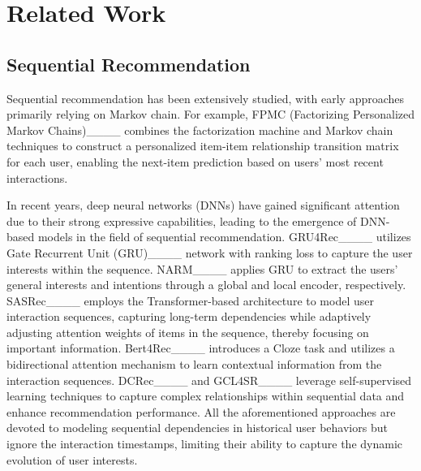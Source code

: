 \section{Related Work}
\subsection{Sequential Recommendation}
Sequential recommendation has been extensively studied, with early approaches primarily relying on Markov chain. For example, FPMC (Factorizing Personalized Markov Chains)____ combines the factorization machine and Markov chain techniques to construct a personalized item-item relationship transition matrix for each user, enabling the next-item prediction based on users' most recent interactions.

In recent years, deep neural networks (DNNs) have gained significant attention due to their strong expressive capabilities, leading to the emergence of DNN-based models in the field of sequential recommendation. GRU4Rec____ utilizes Gate Recurrent Unit (GRU)____ network with ranking loss to capture the user interests within the sequence. NARM____ applies GRU to extract the users' general interests and intentions through a global and local encoder, respectively. SASRec____ employs the Transformer-based architecture to model user interaction sequences, capturing long-term dependencies while adaptively adjusting attention weights of items in the sequence, thereby focusing on important information. Bert4Rec____ introduces a Cloze task and utilizes a bidirectional attention mechanism to learn contextual information from the interaction sequences. DCRec____ and GCL4SR____ leverage self-supervised learning techniques to capture complex relationships within sequential data and enhance recommendation performance. All the aforementioned approaches are devoted to modeling sequential dependencies in historical user behaviors but ignore the interaction timestamps, limiting their ability to capture the dynamic evolution of user interests.


